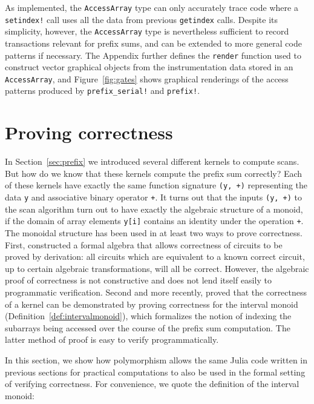 \documentclass{sig-alternate}
\newcommand{\code}[1]{\texttt{#1}}
\begin{document}
As implemented, the \code{AccessArray} type can only accurately trace code
where a \code{setindex!} call uses all the data from previous \code{getindex}
calls. Despite its simplicity, however, the \code{AccessArray} type is
nevertheless sufficient to record transactions relevant for prefix sums, and
can be extended to more general code patterns if necessary. The Appendix
further defines the \code{render} function used to construct vector graphical
objects from the instrumentation data stored in an \code{AccessArray}, and
Figure~\ref{fig:gates} shows graphical renderings of the access patterns
produced by \code{prefix\_serial!} and \code{prefix!}.

\section{Proving correctness}

In Section~\ref{sec:prefix} we introduced several different kernels to compute
scans. But how do we know that these kernels compute the prefix sum correctly?
Each of these kernels have exactly the same function signature \code{(y,
+)} representing the data \code{y} and associative binary operator \code{+}.
It turns out that the inputs \code{(y, +)} to the scan algorithm turn out to
have exactly the algebraic structure of a monoid, if the domain of array
elements \code{y[i]} contains an identity under the operation \code{+}. The
monoidal structure has been used in at least two ways to prove correctness.
First, \cite{Hinze2004} constructed a formal algebra that allows correctness of
circuits to be proved by derivation: all circuits which are equivalent to a
known correct circuit, up to certain algebraic transformations, will all be
correct. However, the algebraic proof of correctness is not constructive and
does not lend itself easily to programmatic verification. Second and more
recently, \cite{Chong2014} proved that the correctness of a kernel can be
demonstrated by proving correctness for the interval monoid
(Definition~\ref{def:intervalmonoid}), which formalizes the notion of indexing
the subarrays being accessed over the course of the prefix sum computation. The
latter method of proof is easy to verify programmatically.

In this section, we show how polymorphism allows the same Julia code written in
previous sections for practical computations to also be used in the formal
setting of verifying correctness. For convenience, we quote the definition of
the interval monoid:
\end{document}
